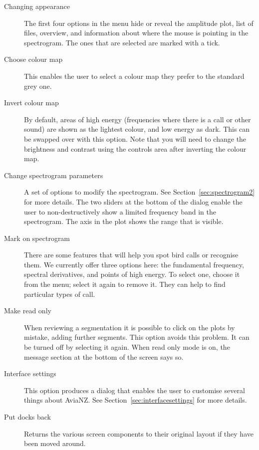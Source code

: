 \documentclass{article}
\begin{document}
\begin{description}
\item [Changing appearance] The first four options in the menu hide or reveal the amplitude plot, list of files, overview, and information about where the mouse is pointing in the spectrogram. The ones that are selected are marked with a tick. 
\item [Choose colour map] This enables the user to select a colour map they prefer to the standard grey one. 
\item [Invert colour map] By default, areas of high energy (frequencies where there is a call or other sound) are shown as the lightest colour, and low energy as dark. This can be swapped over with this option. Note that you will need to change the brightness and contrast using the controls area after inverting the colour map.
\item [Change spectrogram parameters] A set of options to modify the spectrogram.  See Section~\ref{sec:spectrogram2} for more details. %
The two sliders at the bottom of the dialog enable the user to non-destructively show a limited frequency band in the spectrogram. The axis in the plot shows the range that is visible. 
\item [Mark on spectrogram] There are some features that will help you spot bird calls or recognise them. We currently offer three options here: the fundamental frequency, spectral derivatives, and points of high energy. To select one, choose it from the menu; select it again to remove it. They can help to find particular types of call. 
\item [Make read only] When reviewing a segmentation it is possible to click on the plots by mistake, adding further segments. This option avoids this problem. It can be turned off by selecting it again. When read only mode is on, the message section at the bottom of the screen says so. 
\item [Interface settings] This option produces a dialog that enables the user to customise several things about AviaNZ. See Section~\ref{sec:interfacesettings} for more details.
\item [Put docks back] Returns the various screen components to their original layout if they have been moved around. 
\end{description}
\end{document}
